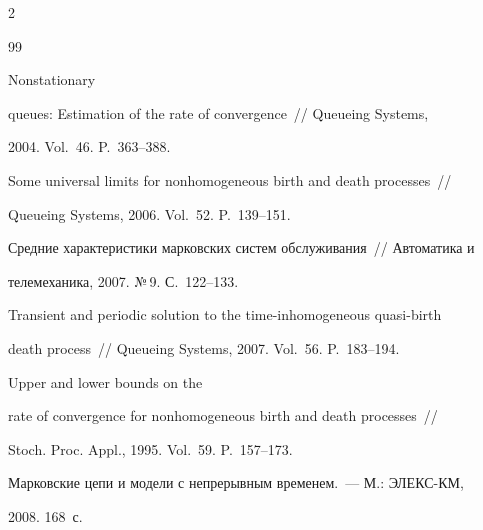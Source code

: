 \begin{multicols}{2}
{{\begin{thebibliography}{99}




Nonstationary


queues: Estimation of the rate of convergence~// Queueing Systems,


2004. Vol.~46. P.~363--388.









 Some universal limits for nonhomogeneous birth and death processes~//


Queueing Systems, 2006. Vol.~52. P.~139--151.









Средние характеристики марковских систем обслуживания~// Автоматика и


телемеханика, 2007. №\,9. С.~122--133.









Transient and periodic solution to the time-inhomogeneous quasi-birth 


death process~// Queueing Systems, 2007. Vol.~56. P.~183--194.









Upper and lower bounds on the


rate of convergence for nonhomogeneous birth and death proc\-esses~// 


Stoch. Proc.  Appl., 1995. Vol.~59. P.~157--173.









Марковские цепи и модели с непрерывным временем.~--- М.: ЭЛЕКС-КМ,


2008. 168~с.






\end{thebibliography}}}
\end{multicols}
